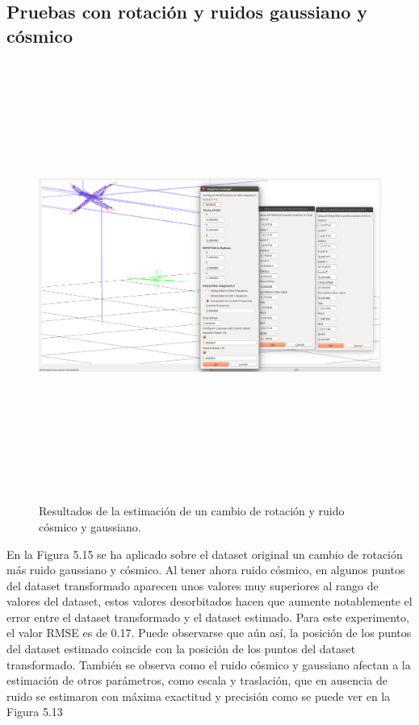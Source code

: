 \subsection{Pruebas con rotación y ruidos gaussiano y cósmico}

\begin{figure}[H]
\begin{center}
\label{fig:opciones de View}\includegraphics[height=14.0cm,width=18.0cm]{img/cap6/Rota_Gauss_Cosmic_abba.png}
\hspace{0.5cm}

\end{center}

\caption{Resultados de la estimación de un cambio de rotación y ruido cósmico y gaussiano.}
\end{figure}

En la Figura 5.15 se ha aplicado sobre el dataset original un cambio de rotación más ruido gaussiano y cósmico. Al tener ahora ruido cósmico, en algunos puntos del dataset transformado aparecen unos valores muy superiores al rango de valores del dataset, estos valores desorbitados hacen que aumente notablemente el error entre el dataset transformado y el dataset estimado. Para este experimento, el valor RMSE es de 0.17.  Puede observarse que aún así, la posición de los puntos del dataset estimado coincide con la posición de los puntos del dataset transformado.
También se observa como el ruido cósmico y gaussiano afectan a la estimación de otros parámetros, como escala y traslación, que en ausencia de ruido se estimaron con máxima exactitud y precisión como se puede ver en la Figura 5.13


